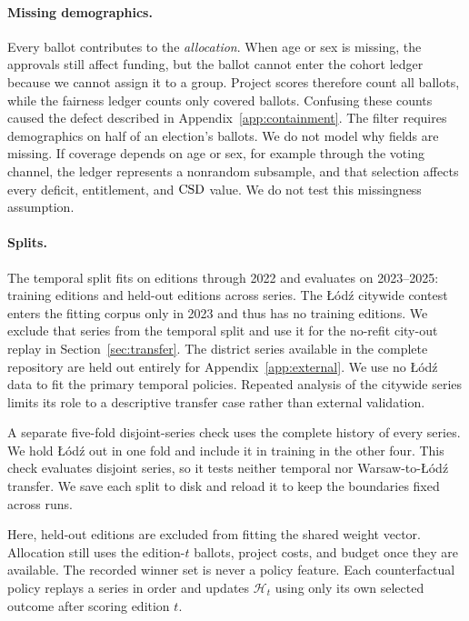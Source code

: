 \paragraph{Missing demographics.}
Every ballot contributes to the \emph{allocation}. When age or sex is missing,
the approvals still affect funding, but the ballot cannot enter the cohort
ledger because we cannot assign it to a group. Project scores therefore count
all ballots, while the fairness ledger counts only covered ballots. Confusing
these counts caused the defect described in Appendix~\ref{app:containment}.
The filter requires demographics on half of an election's ballots. We do not
model why fields are missing. If coverage depends on age or sex, for example
through the voting channel, the ledger represents a nonrandom subsample, and
that selection affects every deficit, entitlement, and $\mathrm{CSD}$ value. We do
not test this missingness assumption.

\paragraph{Splits.}
The temporal split fits on editions through 2022 and evaluates on 2023--2025:
\SplitTrainEditions{} training editions and \SplitTestEditions{} held-out
editions across \EvalSeriesN{} series. The \L{}\'od\'z citywide contest enters
the fitting corpus only in 2023 and thus has no training editions. We exclude
that series from the temporal split and use it for the no-refit city-out replay
in Section~\ref{sec:transfer}. The district series available in the complete
repository are held out entirely for Appendix~\ref{app:external}. We use no
\L{}\'od\'z data to fit the primary temporal policies. Repeated analysis of
the citywide series limits its role to a descriptive transfer case rather than
external validation.

A separate five-fold disjoint-series check uses the complete history of every
series. We hold \L{}\'od\'z out in one fold and include it in training in the
other four. This check evaluates disjoint series, so it tests neither temporal
nor Warsaw-to-\L{}\'od\'z transfer. We save each split to disk and reload it
to keep the boundaries fixed across runs.

Here, held-out editions are excluded from fitting the shared weight vector.
Allocation still uses the edition-$t$ ballots, project costs, and budget once
they are available. The recorded winner set is never a policy feature. Each
counterfactual policy replays a series in order and updates
$\mathcal{H}_{t}$ using only its own selected outcome after scoring edition $t$.

